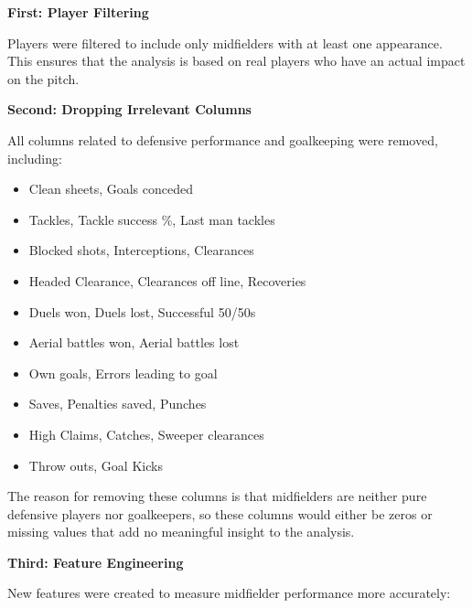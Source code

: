 \documentclass[12pt,a4paper]{article}
\begin{document}
\textbf{First: Player Filtering}

Players were filtered to include only midfielders with at least one appearance. This ensures that the analysis is based on real players who have an actual impact on the pitch.

\textbf{Second: Dropping Irrelevant Columns}

All columns related to defensive performance and goalkeeping were removed, including:
\begin{itemize}
    \item Clean sheets, Goals conceded
    \item Tackles, Tackle success \%, Last man tackles
    \item Blocked shots, Interceptions, Clearances
    \item Headed Clearance, Clearances off line, Recoveries
    \item Duels won, Duels lost, Successful 50/50s
    \item Aerial battles won, Aerial battles lost
    \item Own goals, Errors leading to goal
    \item Saves, Penalties saved, Punches
    \item High Claims, Catches, Sweeper clearances
    \item Throw outs, Goal Kicks
\end{itemize}

The reason for removing these columns is that midfielders are neither pure defensive players nor goalkeepers, so these columns would either be zeros or missing values that add no meaningful insight to the analysis.

\textbf{Third: Feature Engineering}

New features were created to measure midfielder performance more accurately:
\end{document}
